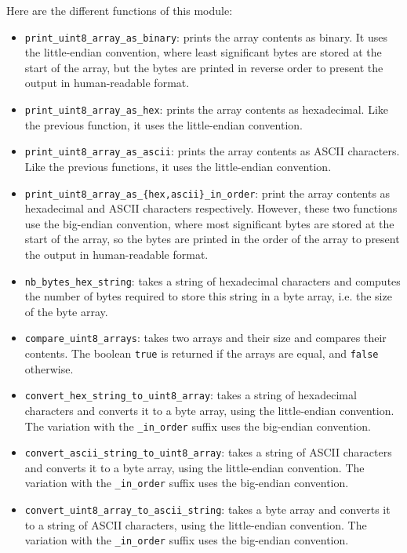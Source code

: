 \documentclass[runningheads]{llncs}
\begin{document}
Here are the different functions of this module:
\begin{itemize}
    \item \texttt{print\_uint8\_array\_as\_binary}: prints the array contents as binary. It uses the little-endian convention, where least significant bytes are stored at the start of the array, but the bytes are printed in reverse order to present the output in human-readable format.
    \item \texttt{print\_uint8\_array\_as\_hex}: prints the array contents as hexadecimal. Like the previous function, it uses the little-endian convention.
    \item \texttt{print\_uint8\_array\_as\_ascii}: prints the array contents as ASCII characters. Like the previous functions, it uses the little-endian convention.
    \item \texttt{print\_uint8\_array\_as\_\{hex,ascii\}\_in\_order}: print the array contents as hexadecimal and ASCII characters respectively. However, these two functions use the big-endian convention, where most significant bytes are stored at the start of the array, so the bytes are printed in the order of the array to present the output in human-readable format.
    \item \texttt{nb\_bytes\_hex\_string}: takes a string of hexadecimal characters and computes the number of bytes required to store this string in a byte array, i.e. the size of the byte array.
    \item \texttt{compare\_uint8\_arrays}: takes two arrays and their size and compares their contents. The boolean \texttt{true} is returned if the arrays are equal, and \texttt{false} otherwise.
    \item \texttt{convert\_hex\_string\_to\_uint8\_array}: takes a string of hexadecimal characters and converts it to a byte array, using the little-endian convention. The variation with the \texttt{\_in\_order} suffix uses the big-endian convention.
    \item \texttt{convert\_ascii\_string\_to\_uint8\_array}: takes a string of ASCII characters and converts it to a byte array, using the little-endian convention. The variation with the \texttt{\_in\_order} suffix uses the big-endian convention.
    \item \texttt{convert\_uint8\_array\_to\_ascii\_string}: takes a byte array and converts it to a string of ASCII characters, using the little-endian convention. The variation with the \texttt{\_in\_order} suffix uses the big-endian convention.
\end{itemize}
\end{document}

